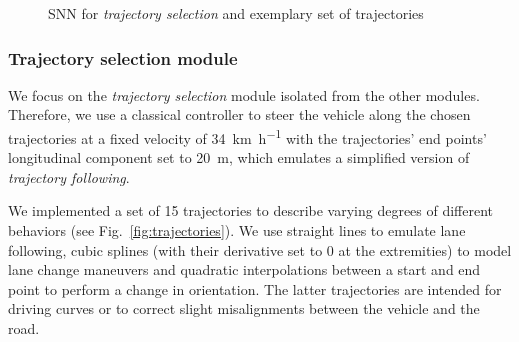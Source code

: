 \begin{figure}[t!]
\centering
{}
\hfill
{}
\caption{\ac{SNN} for \emph{trajectory selection} and exemplary set of trajectories}
\end{figure}

\subsubsection{Trajectory selection module}%
\label{ssubsec:trajectory_selection_module}

We focus on the \emph{trajectory selection} module isolated from the other modules.
Therefore, we use a classical controller to steer the vehicle along the chosen trajectories at a fixed velocity of \SI[per-mode=symbol]{34}{\kilo\metre\per\hour} with the trajectories' end points' longitudinal component set to \SI{20}{\metre}, which emulates a simplified version of \emph{trajectory following}. \par
We implemented a set of \num{15} trajectories to describe varying degrees of different behaviors (see Fig.~\ref{fig:trajectories}).
We use straight lines to emulate lane following, cubic splines (with their derivative set to \num{0} at the extremities) to model lane change maneuvers and quadratic interpolations between a start and end point to perform a change in orientation.
The latter trajectories are intended for driving curves or to correct slight misalignments between the vehicle and the road.

